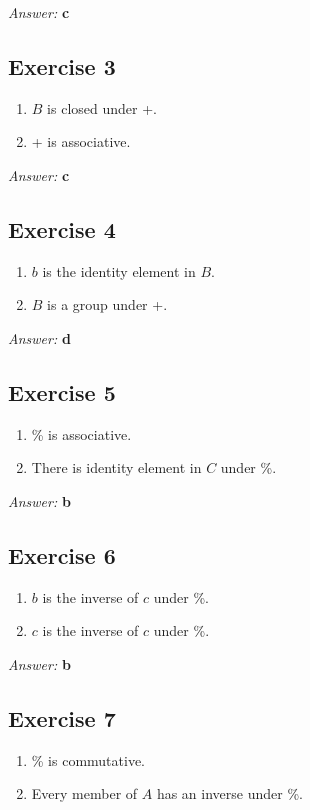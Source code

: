 \documentclass[11pt]{article}
\begin{document}
\emph{Answer:} \textbf{c}
\subsection{Exercise 3}
\label{sec-2-3}
\begin{enumerate}
\item $B$ is closed under +.
\item + is associative.
\end{enumerate}

\emph{Answer:} \textbf{c}
\subsection{Exercise 4}
\label{sec-2-4}
\begin{enumerate}
\item $b$ is the identity element in $B$.
\item $B$ is a group under +.
\end{enumerate}

\emph{Answer:} \textbf{d}
\subsection{Exercise 5}
\label{sec-2-5}
\begin{enumerate}
\item \% is associative.
\item There is identity element in $C$ under \%.
\end{enumerate}

\emph{Answer:} \textbf{b}
\subsection{Exercise 6}
\label{sec-2-6}
\begin{enumerate}
\item $b$ is the inverse of $c$ under \%.
\item $c$ is the inverse of $c$ under \%.
\end{enumerate}

\emph{Answer:} \textbf{b}
\subsection{Exercise 7}
\label{sec-2-7}
\begin{enumerate}
\item \% is commutative.
\item Every member of $A$ has an inverse under \%.
\end{enumerate}
\end{document}
